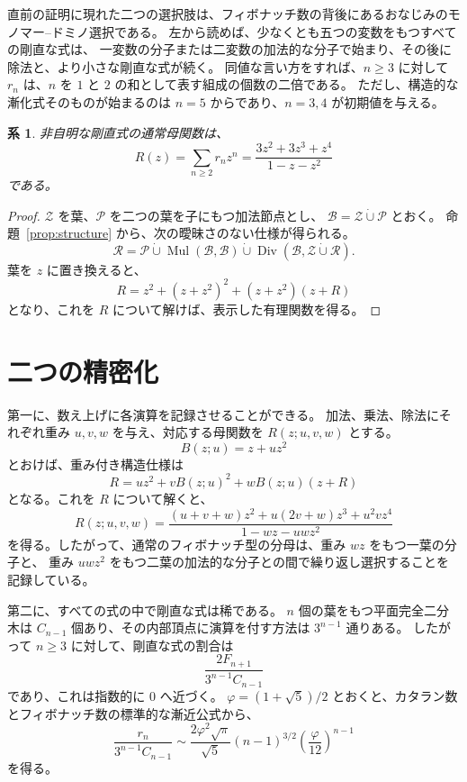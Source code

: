 \documentclass[11pt]{ltjsarticle}
\newtheorem{corollary}[theorem]{系}
\newcommand{\Rcal}{\mathcal{R}}
\newcommand{\Zcal}{\mathcal{Z}}
\newcommand{\Pcal}{\mathcal{P}}
\newcommand{\Bcal}{\mathcal{B}}
\begin{document}
直前の証明に現れた二つの選択肢は、フィボナッチ数の背後にあるおなじみのモノマー--ドミノ選択である。
左から読めば、少なくとも五つの変数をもつすべての剛直な式は、
一変数の分子または二変数の加法的な分子で始まり、その後に除法と、より小さな剛直な式が続く。
同値な言い方をすれば、$n\ge3$ に対して $r_n$ は、$n$ を $1$ と $2$ の和として表す組成の個数の二倍である。
ただし、構造的な漸化式そのものが始まるのは $n=5$ からであり、$n=3,4$ が初期値を与える。

\begin{corollary}\label{cor:gf}
非自明な剛直式の通常母関数は、
\[
 R(z)=\sum_{n\ge2}r_nz^n
     =\frac{3z^2+3z^3+z^4}{1-z-z^2}
\]
である。
\end{corollary}

\begin{proof}
$\Zcal$ を葉、$\Pcal$ を二つの葉を子にもつ加法節点とし、
$\Bcal=\Zcal\mathbin{\dot\cup}\Pcal$ とおく。
命題~\ref{prop:structure} から、次の曖昧さのない仕様が得られる。
\[
 \Rcal
 =\Pcal
 \mathbin{\dot\cup}
 \operatorname{Mul}(\Bcal,\Bcal)
 \mathbin{\dot\cup}
 \operatorname{Div}(\Bcal,\Zcal\mathbin{\dot\cup}\Rcal).
\]
葉を $z$ に置き換えると、
\[
 R=z^2+(z+z^2)^2+(z+z^2)(z+R)
\]
となり、これを $R$ について解けば、表示した有理関数を得る。
\end{proof}

\section{二つの精密化}

第一に、数え上げに各演算を記録させることができる。
加法、乗法、除法にそれぞれ重み $u,v,w$ を与え、対応する母関数を $R(z;u,v,w)$ とする。
\[
 B(z;u)=z+uz^2
\]
とおけば、重み付き構造仕様は
\[
 R=uz^2+vB(z;u)^2+wB(z;u)(z+R)
\]
となる。これを $R$ について解くと、
\[
 R(z;u,v,w)=
 \frac{(u+v+w)z^2+u(2v+w)z^3+u^2vz^4}
      {1-wz-uwz^2}
\]
を得る。したがって、通常のフィボナッチ型の分母は、重み $wz$ をもつ一葉の分子と、
重み $uwz^2$ をもつ二葉の加法的な分子との間で繰り返し選択することを記録している。

第二に、すべての式の中で剛直な式は稀である。
$n$ 個の葉をもつ平面完全二分木は $C_{n-1}$ 個あり、その内部頂点に演算を付す方法は $3^{n-1}$ 通りある。
したがって $n\ge3$ に対して、剛直な式の割合は
\[
 \frac{2F_{n+1}}{3^{n-1}C_{n-1}}
\]
であり、これは指数的に $0$ へ近づく。
$\varphi=(1+\sqrt5)/2$ とおくと、カタラン数とフィボナッチ数の標準的な漸近公式から、
\[
 \frac{r_n}{3^{n-1}C_{n-1}}
 \sim
 \frac{2\varphi^2\sqrt{\pi}}{\sqrt5}
 (n-1)^{3/2}\left(\frac{\varphi}{12}\right)^{n-1}
\]
を得る。
\end{document}
